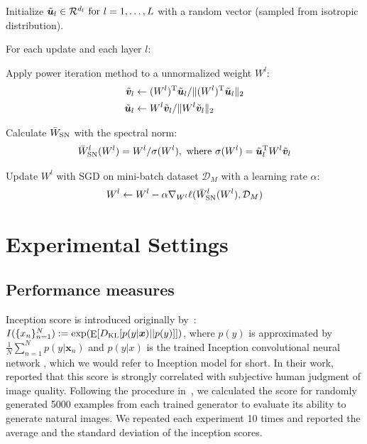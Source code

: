 \documentclass{article}
\newcommand{\bmu}{{\bm u}}
\newcommand{\bmv}{{\bm v}}
\newcommand{\bmx}{{\bm x}}
\newcommand{\E}{\mathop{\mathrm{E}}}
\newenvironment{tight_itemize}{
\begin{itemize}
  \setlength{\itemsep}{0pt}
  \setlength{\parskip}{0pt}
  \setlength{\topsep}{0pt}
  \setlength{\partopsep}{0pt}
}{\end{itemize}}
\newenvironment{tight_enumerate}{
\begin{enumerate}
  \setlength{\itemsep}{0pt}
  \setlength{\parskip}{0pt}
  \setlength{\topsep}{0pt}
  \setlength{\partopsep}{0pt}
}{\end{enumerate}}
\begin{document}
\begin{algorithm}
  \caption{\label{algo:snorm} SGD with spectral normalization}
  \begin{tight_itemize}
  \item Initialize $\tilde{\bmu}_l\in \mathcal{R}^{d_l}~{\rm for}~l=1,\dots,L$ with a random vector (sampled from isotropic distribution).
  \item For each update and each layer $l$:
  \begin{tight_enumerate}
  \item Apply power iteration method to a unnormalized weight $W^l$:
  \begin{align}
      \tilde{\bmv}_l &\leftarrow (W^{l})^{\rm T} \tilde{\bmu}_l/\|(W^{l})^{\rm T} \tilde{\bmu}_l\|_2\\
      \tilde{\bmu}_l &\leftarrow W^{l} \tilde{\bmv}_l/\|W^l \tilde{\bmv}_l\|_2
  \end{align}
  \item Calculate $\bar{W}_{\rm SN}$ with the spectral norm:
  \begin{align}
      \bar{W}_{\rm SN}^l(W^l) = W^l / \sigma(W^l),\ {\rm where}\ \sigma(W^l)=\tilde{\bmu}_l^{\rm T} W^l \tilde{\bmv}_l
  \end{align}
  \item Update $W^l$ with SGD on mini-batch dataset $\mathcal{D}_M$ with a learning rate $\alpha$:
  \begin{align}
      W^l \leftarrow W^l - \alpha \nabla_{W^l} \ell(\bar{W}_{\rm SN}^l(W^l), \mathcal{D}_M)
  \end{align}
  \end{tight_enumerate}
  \end{tight_itemize}
\end{algorithm}

\section{Experimental Settings}

\subsection{\label{apdsubsec:performance_measures}Performance measures}
Inception score is introduced originally by~\cite{salimans2016improved}: $I(\{x_n\}_{n=1}^N) := \exp(\E[D_{\rm KL}[p(y|\bmx)||p(y)]])$,
where $p(y)$ is approximated by $\frac{1}{N}\sum_{n=1}^N p(y|\bmx_n)$ and $p(y|x)$ is the trained Inception convolutional neural network \cite[]{szegedy2015going}, which we would refer to Inception model for short.
In their work,~\cite{salimans2016improved} reported that this score is strongly correlated with subjective human judgment of image quality.
Following the procedure in~\cite{salimans2016improved,warde2016improving}, we calculated the score for randomly generated 5000 examples from each trained generator to evaluate its ability to generate natural images.
We repeated each experiment 10 times and reported the average and the standard deviation of the inception scores.
\end{document}

